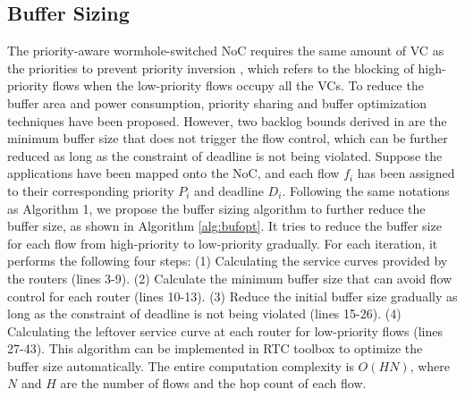 \documentclass[10pt,journal]{IEEEtran}
\begin{document}
\subsection{Buffer Sizing}\label{bufferopt}
The priority-aware wormhole-switched NoC \cite{Shi:2008:RCA:1397757.1397996} requires the same amount of VC as the priorities to prevent priority inversion \cite{707545}, which refers to the blocking of high-priority flows when the low-priority flows occupy all the VCs. To reduce the buffer area and power consumption, priority sharing \cite{5161497} and buffer optimization \cite{189} techniques have been proposed. However, two backlog bounds derived in \cite{189} are the minimum buffer size that does not trigger the flow control, which can be further reduced as long as the constraint of deadline is not being violated. Suppose the applications have been mapped onto the NoC, and each flow $f_i$ has been assigned to their corresponding priority $P_i$ and deadline $D_i$. Following the same notations as Algorithm 1, we propose the buffer sizing algorithm to further reduce the buffer size, as shown in Algorithm \ref{alg:bufopt}. It tries to reduce the buffer size for each flow from high-priority to low-priority gradually. For each iteration, it performs the following four steps: (1) Calculating the service curves provided by the routers (lines 3-9). (2) Calculate the minimum buffer size that can avoid flow control for each router (lines 10-13). (3) Reduce the initial buffer size gradually as long as the constraint of deadline is not being violated (lines 15-26). (4) Calculating the leftover service curve at each router for low-priority flows (lines 27-43). This algorithm can be implemented in RTC toolbox \cite{rtc} to optimize the buffer size automatically. The entire computation complexity is $O(HN)$, where $N$ and $H$ are the number of flows and the hop count of each flow.
\end{document}
